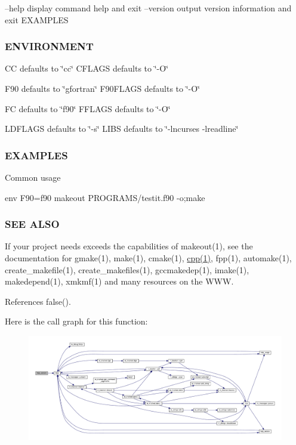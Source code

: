 --help display command help and exit --version output version information and exit E\+X\+A\+M\+P\+L\+ES

\subsubsection*{E\+N\+V\+I\+R\+O\+N\+M\+E\+NT}

CC defaults to \char`\"{}cc\char`\"{} C\+F\+L\+A\+GS defaults to \char`\"{}-\/\+O\char`\"{}

F90 defaults to \char`\"{}gfortran\char`\"{} F90\+F\+L\+A\+GS defaults to \char`\"{}-\/\+O\char`\"{}

FC defaults to \char`\"{}f90\char`\"{} F\+F\+L\+A\+GS defaults to \char`\"{}-\/\+O\char`\"{}

L\+D\+F\+L\+A\+GS defaults to \char`\"{}-\/s\char`\"{} L\+I\+BS defaults to \char`\"{}-\/lncurses -\/lreadline\char`\"{} \subsubsection*{E\+X\+A\+M\+P\+L\+ES}

\begin{DoxyVerb} Common usage

     env F90=f90 makeout PROGRAMS/testit.f90 -o;make
\end{DoxyVerb}


\subsubsection*{S\+EE A\+L\+SO}

If your project needs exceeds the capabilities of makeout(1), see the documentation for gmake(1), make(1), cmake(1), \hyperlink{ufpp__overview_81_8txt_ad80405d1dd53db5cd0aa7a8cc7e457a3}{cpp(1)}, fpp(1), automake(1), create\+\_\+makefile(1), create\+\_\+makefiles(1), gccmakedep(1), imake(1), makedepend(1), xmkmf(1) and many resources on the W\+WW. 

References false().

Here is the call graph for this function\+:
\nopagebreak
\begin{figure}[H]
\begin{center}
\leavevmode
\includegraphics[width=350pt]{makeout_8f90_a39c21619b08a3c22f19e2306efd7f766_cgraph}
\end{center}
\end{figure}
\mbox{\label{makeout_8f90_affb61c1ee20c534b741b72ed67c9c778}} 
